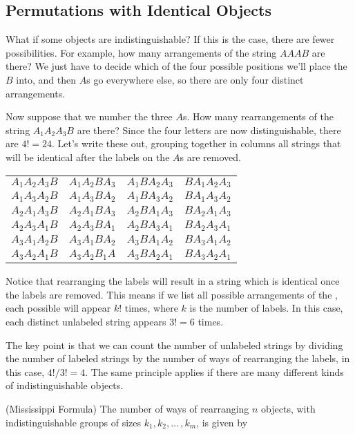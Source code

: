 \subsection*{Permutations with Identical Objects}
\par
What if some objects are indistinguishable? If this is the case, there are fewer possibilities. For example, how many arrangements of the string $AAAB$ are there? We just have to decide which of the four possible positions we'll place the $B$ into, and then $A$s go everywhere else, so there are only four distinct arrangements.

Now suppose that we number the three $A$s. How many rearrangements of the string $A_1A_2A_3B$ are there? Since the four letters are now distinguishable, there are $4! = 24$. Let's write these out, grouping together in columns all strings that will be identical after the labels on the $A$s are removed.
\begin{center}
\begin{tabular}{cccc}
$A_1A_2A_3B$ & $A_1A_2BA_3$ & $A_1BA_2A_3$ & $BA_1A_2A_3$ \\
$A_1A_3A_2B$ & $A_1A_3BA_2$ & $A_1BA_3A_2$ & $BA_1A_3A_2$ \\
$A_2A_1A_3B$ & $A_2A_1BA_3$ & $A_2BA_1A_3$ & $BA_2A_1A_3$ \\
$A_2A_3A_1B$ & $A_2A_3BA_1$ & $A_2BA_3A_1$ & $BA_2A_3A_1$ \\
$A_3A_1A_2B$ & $A_3A_1BA_2$ & $A_3BA_1A_2$ & $BA_3A_1A_2$ \\
$A_3A_2A_1B$ & $A_3A_2B_1A$ & $A_3BA_2A_1$ & $BA_3A_2A_1$ \\
\end{tabular}
\end{center}
Notice that rearranging the labels will result in a string which is identical once the labels are removed. This means if we list all possible arrangements of the , each possible  will appear $k!$ times, where $k$ is the number of labels. In this case, each distinct unlabeled string appears $3! = 6$ times.
\par
The key point is that we can count the number of unlabeled strings by dividing the number of labeled strings by the number of ways of rearranging the labels, in this case, $4! / 3! = 4$. The same principle applies if there are many different kinds of indistinguishable objects.
\par
\begin{prop} (Mississippi Formula) The number of ways of rearranging $n$ objects, with indistinguishable groups of sizes $k_1, k_2, \dots\, ,k_m$, is given by
\end{prop}
